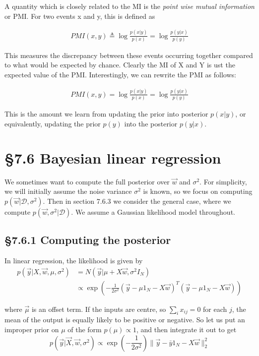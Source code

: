 \documentclass{amsart}
\begin{document}
A quantity which is closely related to the MI is the \emph{point wise mutual information}
or PMI. For two events x and y, this is defined as

\begin{align*}
	PMI(x, y) \triangleq \log{\frac{p(x|y)}{p(x)}} = \log{\frac{p(y|x)}{p(y)}}
\end{align*}

This measures the discrepancy between these events occurring together compared to what
would be expected by chance. Clearly the MI of X and Y is ust the expected value
of the PMI. Interestingly, we can rewrite the PMI as follows:

\begin{align*}
	PMI(x, y) = \log{\frac{p(x|y)}{p(x)}} = \log{\frac{p(y|x)}{p(y)}}
\end{align*}

This is the amount we learn from updating the prior into posterior $p(x|y)$, or
equivalently, updating the prior $p(y)$ into the posterior $p(y|x)$.

\section{\S 7.6 Bayesian linear regression}

We sometimes want to compute the full posterior over $\vec{w}$ and $\sigma^2$. For
simplicity, we will initially assume the noise variance $\sigma^2$ is known, so we
focus on computing $p(\vec{w}|\mathcal{D}, \sigma^2)$. Then in section 7.6.3 we
consider the general case, where we compute $p(\vec{w}, \sigma^2|\mathcal{D})$. We assume
a Gaussian likelihood model throughout.

\subsection{\S 7.6.1 Computing the posterior}
In linear regression, the likelihood is given by
\begin{align*}
	p(\vec{y}|X, \vec{w}, \mu, \sigma^2) &= N(\vec{y}|\mu+ X \vec{w}, \sigma^2 I_N) \\
	&\propto \exp{\left(- \frac{1}{2 \sigma^2} (\vec{y} - \mu 1_N - X \vec{w})^T (\vec{y} - \mu 1_N - X \vec{w})\right)}
\end{align*}

where $\vec{\mu}$ is an offset term. If the inputs are centre, so $\sum_i x_{ij} = 0$ for
each $j$, the mean of the output is equally likely to be positive or negative. So let us
put an improper prior on $\mu$ of the form $p(\mu) \propto 1$, and then integrate it out
to get
\[
	p(\vec{y}|\vec{X}, \vec{w}, \sigma^2) \propto \exp{(-\frac{1}{2 \sigma^2}) 
		\|\vec{y} - \bar{y} 1_N - X \vec{w}\|^2_2} 
\]
\end{document}
